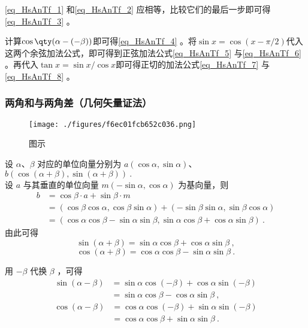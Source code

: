 \autoref{eq_HsAnTf_1} 和\autoref{eq_HsAnTf_2} 应相等，比较它们的最后一步即可得\autoref{eq_HsAnTf_3} 。

计算$\cos\qty(\alpha-(-\beta))$即可得\autoref{eq_HsAnTf_4} 。将$\sin x=\cos(x-\pi/2)$代入这两个余弦加法公式，即可得到正弦加法公式\autoref{eq_HsAnTf_5} 与\autoref{eq_HsAnTf_6} 。再代入$\tan x=\sin x/\cos x$即可得正切的加法公式\autoref{eq_HsAnTf_7} 与\autoref{eq_HsAnTf_8} 。



\subsubsection{两角和与两角差（几何矢量证法）}
\begin{figure}[ht]
\centering
\texttt{[image: ./figures/f6ec01fcb652c036.png]}
\caption{图示} \label{fig_HsAnTf_1}
\end{figure}
设 $\alpha$、$\beta$ 对应的单位向量分别为 $a(\cos\alpha,\sin\alpha)$、$b(\cos(\alpha+\beta),\sin(\alpha+\beta))~.$\\
设 $a$ 与其垂直的单位向量 $m(-\sin\alpha,\cos\alpha)$ 为基向量，则
\begin{equation}
\begin{aligned}
b &= \cos\beta \cdot a + \sin\beta \cdot m \\
&= (\cos\beta \cos\alpha,\cos\beta \sin\alpha) + (-\sin\beta \sin\alpha,\sin\beta \cos\alpha) \\
&= (\cos\alpha \cos\beta-\sin\alpha \sin\beta,\sin\alpha \cos\beta + \cos\alpha \sin\beta)~.
\end{aligned}
\end{equation}
由此可得
\begin{equation}
\sin(\alpha+\beta) = \sin\alpha \cos\beta + \cos\alpha \sin\beta~,
\end{equation}
\begin{equation}
\cos(\alpha+\beta) = \cos\alpha \cos\beta - \sin\alpha \sin\beta~.
\end{equation}

用 $-\beta$ 代换 $\beta$ ，可得
\begin{equation}
\begin{aligned}
\sin(\alpha-\beta) &= \sin\alpha \cos(-\beta) + \cos\alpha \sin(-\beta)\\
&=\sin\alpha \cos\beta - \cos\alpha \sin\beta~,
\end{aligned}
\end{equation}
\begin{equation}
\begin{aligned}
\cos(\alpha-\beta) &= \cos\alpha \cos(-\beta) + \sin\alpha \sin(-\beta)\\
&=\cos\alpha \cos\beta + \sin\alpha \sin\beta~.
\end{aligned}
\end{equation}

